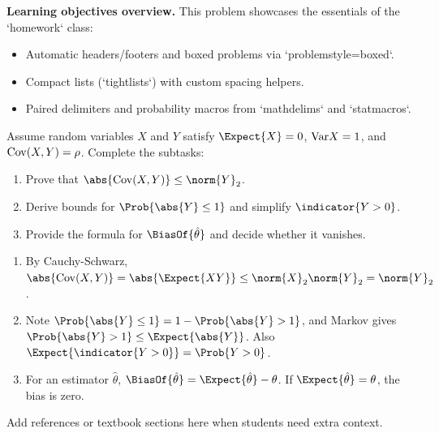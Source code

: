 \documentclass[problemstyle=boxed,theme=color,captionstyle=compact,subnumbering,tightlists,mathdelims,statmacros,localizedate]{homework}
\begin{document}
\maketitle

\pagebreak

\begin{problem}
    \textbf{Learning objectives overview.} This problem showcases the essentials of the `homework` class:
    \begin{itemize}
        \item Automatic headers/footers and boxed problems via `problemstyle=boxed`.
        \item Compact lists (`tightlists`) with custom spacing helpers.
        \item Paired delimiters and probability macros from `mathdelims` and `statmacros`.
    \end{itemize}

    Assume random variables $X$ and $Y$ satisfy $\Expect{X}=0$, $\mathrm{Var}{X}=1$, and $\mathrm{Cov}(X,Y)=\rho$. Complete the subtasks:
    \begin{enumerate}
        \item Prove that $\abs{\Cov(X,Y)} \leq \norm{Y}_2$.
        \item Derive bounds for $\Prob{\abs{Y}\leq 1}$ and simplify $\indicator{Y>0}$.
        \item Provide the formula for $\BiasOf{\hat\theta}$ and decide whether it vanishes.
    \end{enumerate}

    \solution

    \begin{enumerate}
        \item By Cauchy-Schwarz, $\abs{\Cov(X,Y)}=\abs{\Expect{XY}}\leq\norm{X}_2\norm{Y}_2=\norm{Y}_2$.
        \item Note $\Prob{\abs{Y}\leq 1}=1-\Prob{\abs{Y}>1}$, and Markov gives $\Prob{\abs{Y}>1}\leq\Expect{\abs{Y}}$. Also $\Expect{\indicator{Y>0}}=\Prob{Y>0}$.
        \item For an estimator $\hat\theta$, $\BiasOf{\hat\theta}=\Expect{\hat\theta}-\theta$. If $\Expect{\hat\theta}=\theta$, the bias is zero.
    \end{enumerate}

    \begin{note}
        Add references or textbook sections here when students need extra context.
    \end{note}
\end{problem}
\end{document}
